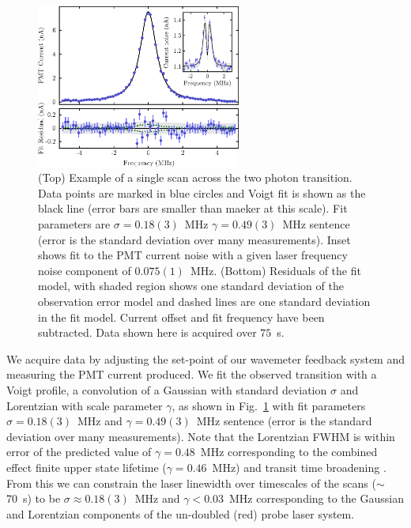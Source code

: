 \documentclass[%
 amsmath,amssymb,
aps,
]{revtex4-2}
\begin{document}
\begin{figure}
    \centering
    \includegraphics[width=0.6\textwidth]{SOMs/2p_scan_single}
    \caption{(Top) Example of a single scan across the two photon transition. Data points are marked in blue circles and Voigt fit is shown as the black line (error bars are smaller than maeker at this scale). Fit parameters are $\sigma=0.18(3)$~MHz $\gamma=0.49(3)$~MHz sentence (error is the standard deviation over many measurements). Inset shows fit to the PMT current noise with a given laser frequency noise component of \(0.075(1)\)~MHz. (Bottom) Residuals of the fit model, with shaded region shows one standard deviation of the observation error model and dashed lines are one standard deviation in the fit model. Current offset and fit frequency have been subtracted. Data shown here is acquired over \(75\)~s. }
    \label{fig:2p_scan_single}
\end{figure}

We acquire data by adjusting the set-point of our wavemeter feedback system and measuring the PMT current produced. We fit the observed transition with a Voigt profile, a convolution of a Gaussian with standard deviation \(\sigma\) and Lorentzian with  scale parameter \(\gamma\), as shown in Fig.~\ref{fig:2p_scan_single} with fit parameters $\sigma=0.18(3)$~MHz and $\gamma=0.49(3)$~MHz sentence (error is the standard deviation over many measurements). Note that the Lorentzian FWHM is within error of the predicted value of $\gamma=0.48$~MHz corresponding to the combined effect finite upper state lifetime ($\gamma=0.46$~MHz) and transit time broadening \cite{Fendel:07}. From this we can constrain the laser linewidth over timescales of the scans ($\sim$70~s) to be $\sigma\approx0.18(3)$~MHz and $\gamma<0.03$~MHz corresponding to the Gaussian and Lorentzian components of the un-doubled (red) probe laser system.
 
\end{document}

